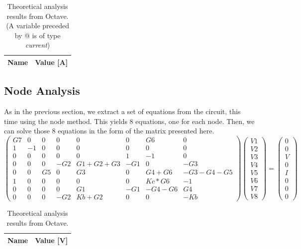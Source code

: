 \begin{table}[h]
  \centering
  \begin{tabular}{|l|r|}
    \hline    
    {\bf Name} & {\bf Value [A]} \\ \hline
     
  \end{tabular}
  \caption{Theoretical analysis results from Octave. (A variable preceded by @ is of type {\em current})}
  \label{tab:mesh}
\end{table}

\subsection{Node Analysis}

As in the previous section, we extract a set of equations from the circuit, this time using the node method. This yields 8 equations, one for each node. Then, we can solve those 8 equations in the form of the matrix presented here.
\begin{equation}
\begin{pmatrix}
G7 & 0 & 0 & 0 & 0 & 0 & G6 & 0\\
1 & -1 & 0 & 0 & 0 & 0 & 0 & 0\\
0 & 0 & 0 & 0 & 0 & 1 & -1 & 0\\
0 & 0 & 0 & -G2 & G1+G2+G3 & -G1 & 0 & -G3\\
0 & 0 & G5 & 0 & G3 & 0 & G4+G6 & -G3-G4-G5\\
1 & 0 & 0 & 0 & 0 & 0& Kc*G6 & -1\\
0 & 0 & 0 & 0 & G1 & -G1 & -G4-G6 & G4\\
0 & 0 & 0 & -G2 & Kb+G2 & 0 & 0 & -Kb
\end{pmatrix}
\begin{pmatrix}
V1\\
V2\\
V3\\
V4\\
V5\\
V6\\
V7\\
V8
\end{pmatrix}
=
\begin{pmatrix}
0\\
0\\
V\\
0\\
I\\
0\\
0\\
0
\end{pmatrix}
\end{equation}

\begin{table}[h]
  \centering
  \begin{tabular}{|l|r|}
    \hline    
    {\bf Name} & {\bf Value [V]} \\ \hline
     
  \end{tabular}
  \caption{Theoretical analysis results from Octave.}
  \label{tab:node}
\end{table}
